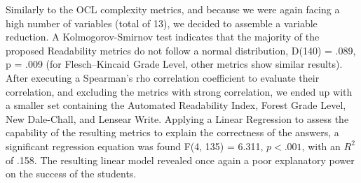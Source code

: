 Similarly to the OCL complexity metrics, and because we were again facing a high number of variables (total of 13), we decided to assemble a variable reduction. A Kolmogorov-Smirnov test indicates that the majority of the proposed Readability metrics do not follow a normal distribution, D(140) = .089, p = .009 (for Flesch–Kincaid Grade Level, other metrics show similar results). After executing a Spearman’s rho correlation coefficient to evaluate their correlation, and excluding the metrics with strong correlation, we ended up with a smaller set containing the Automated Readability Index, Forest Grade Level, New Dale-Chall, and Lensear Write. Applying a Linear Regression to assess the capability of the resulting metrics to explain the correctness of the answers, a significant regression equation was found F(4, 135) = 6.311, $p<.001$, with an $R^{2}$ of .158. The resulting linear model revealed once again a poor explanatory power on the success of the students.

